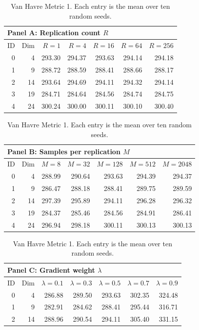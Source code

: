\begin{table}[htbp]
\centering
\small
\setlength{\tabcolsep}{6pt}
\renewcommand{\arraystretch}{1.08}
\caption{Van Havre Metric 1. Each entry is the mean over ten random seeds.}
\label{tab:van_havre_all_parameters_metric1}
\begin{tabular}{rrrrrrr}
\toprule
\multicolumn{7}{l}{\textbf{Panel A: Replication count $R$}} \\
\midrule
ID & Dim & $R=1$ & $R=4$ & $R=16$ & $R=64$ & $R=256$ \\
\midrule
0 & 4 & 293.30 & 294.37 & 293.63 & 294.14 & 294.18 \\
1 & 9 & 288.72 & 288.59 & 288.41 & 288.66 & 288.17 \\
2 & 14 & 293.64 & 294.69 & 294.11 & 294.32 & 294.14 \\
3 & 19 & 284.71 & 284.64 & 284.56 & 284.74 & 284.75 \\
4 & 24 & 300.24 & 300.00 & 300.11 & 300.10 & 300.40 \\
\bottomrule
\end{tabular}
\par\medskip
\begin{tabular}{rrrrrrr}
\toprule
\multicolumn{7}{l}{\textbf{Panel B: Samples per replication $M$}} \\
\midrule
ID & Dim & $M=8$ & $M=32$ & $M=128$ & $M=512$ & $M=2048$ \\
\midrule
0 & 4 & 288.99 & 290.64 & 293.63 & 294.39 & 294.37 \\
1 & 9 & 286.47 & 288.18 & 288.41 & 289.75 & 289.59 \\
2 & 14 & 297.39 & 295.89 & 294.11 & 296.28 & 296.32 \\
3 & 19 & 284.37 & 285.46 & 284.56 & 284.91 & 286.41 \\
4 & 24 & 296.94 & 298.18 & 300.11 & 300.13 & 300.13 \\
\bottomrule
\end{tabular}
\par\medskip
\begin{tabular}{rrrrrrr}
\toprule
\multicolumn{7}{l}{\textbf{Panel C: Gradient weight $\lambda$}} \\
\midrule
ID & Dim & $\lambda=0.1$ & $\lambda=0.3$ & $\lambda=0.5$ & $\lambda=0.7$ & $\lambda=0.9$ \\
\midrule
0 & 4 & 286.88 & 289.50 & 293.63 & 302.35 & 324.48 \\
1 & 9 & 282.91 & 284.62 & 288.41 & 295.44 & 316.71 \\
2 & 14 & 288.96 & 290.54 & 294.11 & 305.40 & 331.15 \\

\end{tabular}
\end{table}
